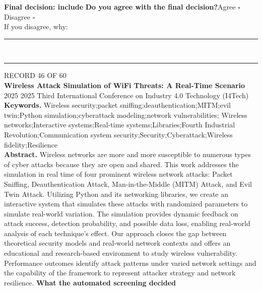 \documentclass[11pt,a4paper]{article}
\begin{document}
{\small\textbf{Final decision: include}}
\vspace{2mm}
{\small\textbf{Do you agree with the final decision?}\quad{}Agree $\square$\qquad{}Disagree $\square$}\\[1mm]
{\footnotesize\color{soft}If you disagree, why:}\\[1mm]
\color{rule}\rule{\linewidth}{0.3pt}\\[3mm]\rule{\linewidth}{0.3pt}\color{black}
\clearpage
{\color{soft}\footnotesize RECORD 46 OF 60}\\[1mm]
{\large\bfseries Wireless Attack Simulation of WiFi Threats: A Real-Time Scenario}\\[1.5mm]
{\color{soft}\small 2025 \textperiodcentered{} 2025 Third International Conference on Industry 4.0 Technology (I4Tech)}\\[2mm]
{\small\textbf{Keywords.} Wireless security;packet sniffing;deauthentication;MITM;evil twin;Python simulation;cyberattack modeling;network vulnerabilities; Wireless networks;Interactive systems;Real-time systems;Libraries;Fourth Industrial Revolution;Communication system security;Security;Cyberattack;Wireless fidelity;Resilience}\\[2mm]
{\small\textbf{Abstract.} Wireless networks are more and more susceptible to numerous types of cyber attacks because they are open and shared. This work addresses the simulation in real time of four prominent wireless network attacks: Packet Sniffing, Deauthentication Attack, Man-in-the-Middle (MITM) Attack, and Evil Twin Attack. Utilizing Python and its networking libraries, we create an interactive system that simulates these attacks with randomized parameters to simulate real-world variation. The simulation provides dynamic feedback on attack success, detection probability, and possible data loss, enabling real-world analysis of each technique's effect. Our approach closes the gap between theoretical security models and real-world network contexts and offers an educational and research-based environment to study wireless vulnerability. Performance outcomes identify attack patterns under varied network settings and the capability of the framework to represent attacker strategy and network resilience.}
\vspace{3mm}
\vspace{2.5mm}
{\small\textbf{What the automated screening decided}}\\[2mm]
\end{document}
